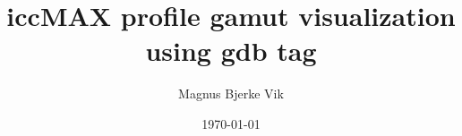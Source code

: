 \documentclass[titlepage, 11pt]{article}
\title{iccMAX profile gamut visualization using gdb tag}
\author{Magnus Bjerke Vik}
\date{\today}
\begin{document}
\maketitle

\begin{abstract}

\end{abstract}

\tableofcontents
\clearpage




\end{document}
